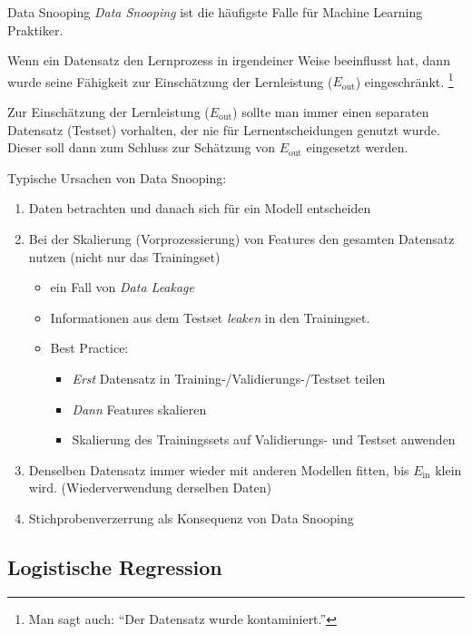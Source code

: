 \begin{defi}{Data Snooping}
    \emph{Data Snooping} ist die häufigste Falle für Machine Learning Praktiker.

    Wenn ein Datensatz den Lernprozess in irgendeiner Weise beeinflusst hat, dann wurde seine Fähigkeit zur Einschätzung der Lernleistung ($E_\text{out}$) eingeschränkt.
    \footnote{
        Man sagt auch: \enquote{Der Datensatz wurde kontaminiert.}
    }

    Zur Einschätzung der Lernleistung ($E_\text{out}$) sollte man immer einen separaten Datensatz (Testset) vorhalten, der nie für Lernentscheidungen genutzt wurde.
    Dieser soll dann zum Schluss zur Schätzung von $E_\text{out}$ eingesetzt werden.

    Typische Ursachen von Data Snooping:
    \begin{enumerate}
        \item Daten betrachten und danach sich für ein Modell entscheiden
        \item Bei der Skalierung (Vorprozessierung) von Features den gesamten Datensatz nutzen (nicht nur das Trainingset)
              \begin{itemize}
                  \item ein Fall von \emph{Data Leakage}
                  \item Informationen aus dem Testset \emph{leaken} in den Trainingset.
                  \item Best Practice:
                        \begin{itemize}
                            \item \emph{Erst} Datensatz in Training-/Validierungs-/Testset teilen
                            \item \emph{Dann} Features skalieren
                            \item Skalierung des Trainingssets auf Validierungs- und Testset anwenden
                        \end{itemize}
              \end{itemize}
        \item Denselben Datensatz immer wieder mit anderen Modellen fitten, bis $E_\text{in}$ klein wird. (Wiederverwendung derselben Daten)
        \item Stichprobenverzerrung als Konsequenz von Data Snooping
    \end{enumerate}
\end{defi}

\subsection{Logistische Regression}


